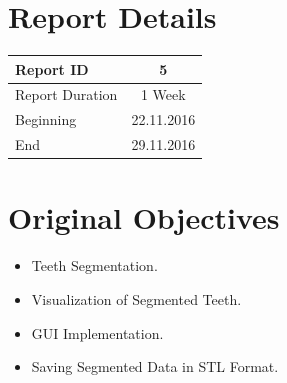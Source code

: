 \documentclass[12pt, b5paper]{article}
\begin{document}
\title{\rmfamily\normalfont{}}

\author{{\small Automatic Mandible Segmentation Using VTK}}

\date{\footnotesize{\today}}

\maketitle

% 
 


\section{Report Details}
\begin{center}
\begin{tabular}{ l | c }
\hline 
Report ID & 5   \\ %
\hline 
Report Duration & 1 Week \\ %
\hline 
Beginning & 22.11.2016 \\ %
\hline 
End & 29.11.2016 \\ %
\hline 
\end{tabular}
\end{center}

\section{Original Objectives}
\begin{itemize}
\item Teeth Segmentation.
\item Visualization of Segmented Teeth.
\item GUI Implementation.
\item Saving Segmented Data in STL Format.
\end{itemize}
\end{document}
